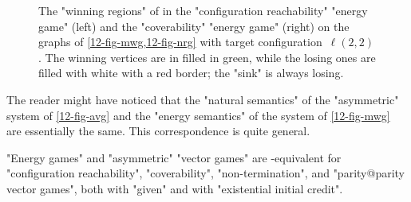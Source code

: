 \begin{figure}[htbp]
{}
  \caption{\label{12-fig-cov-nrg} The "winning regions" of \Eve in the
    "configuration reachability" "energy game" (left) and the
    "coverability" "energy game"
    (right) on the graphs of \cref{12-fig-mwg,12-fig-nrg} with target
    configuration~$\ell(2,2)$.  The winning vertices are in filled in
    green, while the losing ones are filled with white with a red
    border; the "sink" is always losing.}
\end{figure}

The reader might have noticed that the "natural semantics" of the
"asymmetric" system of \cref{12-fig-avg} and the "energy semantics" of
the system of \cref{12-fig-mwg} are essentially the same.  This
correspondence is quite general.
\begin{lemma}\label{12-fact-nrg}
  "Energy games" and "asymmetric" "vector games" are
  \logspace-equivalent for "configuration reachability",
  "coverability", "non-termination", and "parity@parity vector games",
  both with "given" and with "existential initial credit".
\end{lemma}
